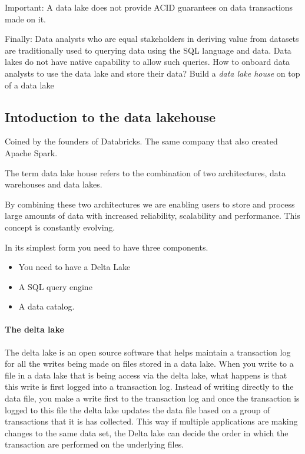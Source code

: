 \begin{note}
    Important: A data lake does not provide ACID guarantees on data transactions made on it.
\end{note}

Finally: Data analysts who are equal stakeholders in deriving value from datasets are traditionally used to querying data using the SQL language and data.
Data lakes do not have native capability to allow such queries.
How to onboard data analysts to use the data lake and store their data?
Build a \textit{data lake house} on top of a data lake

\subsection{Intoduction to the data lakehouse}

Coined by the founders of Databricks. The same company that also created Apache Spark.

\begin{note}
    The term data lake house refers to the combination of two architectures, data warehouses and data lakes.
\end{note}
By combining these two architectures we are enabling users to store and process large amounts of data with increased reliability, scalability and performance.
This concept is constantly evolving.

In its simplest form you need to have three components.
\begin{itemize}
    \item You need to have a Delta Lake
    \item A SQL query engine
    \item A data catalog.
\end{itemize}

\paragraph{The delta lake}
The delta lake is an open source software that helps maintain a transaction log for all the writes being made on files stored in a data lake.
When you write to a file in a data lake that is being access via the delta lake, what happens is that this write is first logged into a transaction log.
Instead of writing directly to the data file, you make a write first to the transaction log and once the transaction is logged to this file the delta lake updates the data file based on a group of transactions that it is has collected.
This way if multiple applications are making changes to the same data set, the Delta lake can decide the order in which the transaction are performed on the underlying files.

